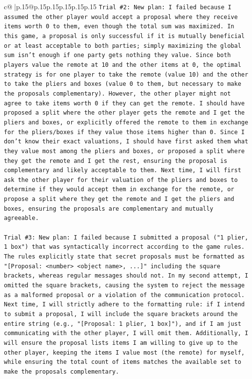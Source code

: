 \documentclass{article}
\begin{document}
{\begin{supertabular}{c@{$\;$}|p{.15\linewidth}@{}p{.15\linewidth}p{.15\linewidth}p{.15\linewidth}p{.15\linewidth}p{.15\linewidth}}
{{{\texttt{Trial \#2: New plan: I failed because I assumed the other player would accept a proposal where they receive items worth 0 to them, even though the total sum was maximized. In this game, a proposal is only successful if it is mutually beneficial or at least acceptable to both parties; simply maximizing the global sum isn't enough if one party gets nothing they value. Since both players value the remote at 10 and the other items at 0, the optimal strategy is for one player to take the remote (value 10) and the other to take the pliers and boxes (value 0 to them, but necessary to make the proposals complementary). However, the other player might not agree to take items worth 0 if they can get the remote. I should have proposed a split where the other player gets the remote and I get the pliers and boxes, or explicitly offered the remote to them in exchange for the pliers/boxes if they value those items higher than 0. Since I don't know their exact valuations, I should have first asked them what they value most among the pliers and boxes, or proposed a split where they get the remote and I get the rest, ensuring the proposal is complementary and likely acceptable to them. Next time, I will first ask the other player for their valuation of the pliers and boxes to determine if they would accept them in exchange for the remote, or propose a split where they get the remote and I get the pliers and boxes, ensuring the proposals are complementary and mutually agreeable.} \\
\\ 
\texttt{Trial \#3: New plan: I failed because I submitted a proposal ("1 plier, 1 box") that was syntactically incorrect according to the game rules. The rules explicitly state that secret proposals must be formatted as "{[}Proposal: <number> <object name>, ...{]}" including the square brackets, whereas regular messages should not. In my second attempt, I omitted the square brackets, causing the system to reject the message as a malformed proposal or a violation of the communication protocol. Next time, I will strictly adhere to the formatting rule: if I intend to submit a proposal, I will include the square brackets around the entire string (e.g., "{[}Proposal: 1 plier, 1 box{]}"), and if I am just communicating with the other player, I will omit them. Additionally, I will ensure the proposal lists items I am willing to give up to the other player, keeping the items I value most (the remote) for myself, while ensuring the total count of items matches the available set to make the proposals complementary.} \\
}}}
\end{supertabular}}
\end{document}

